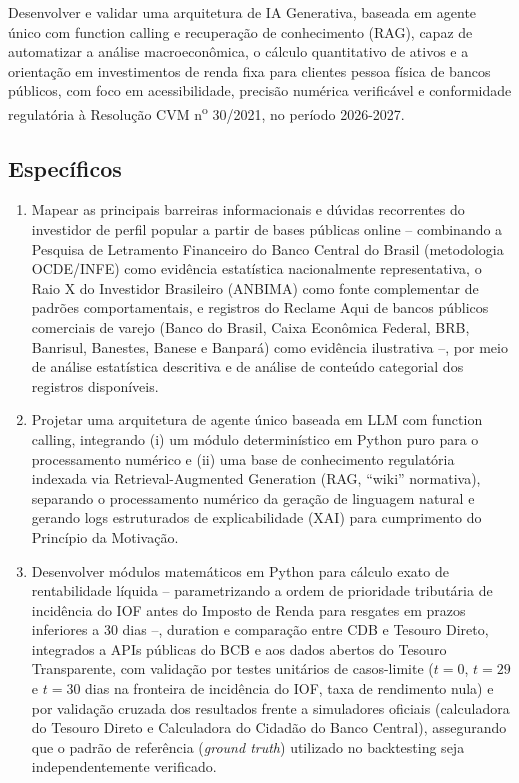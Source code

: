 Desenvolver e validar uma arquitetura de IA Generativa, baseada em agente
\'unico com function calling e recupera\c{c}\~ao de conhecimento (RAG),
capaz de automatizar a an\'alise macroecon\^omica, o c\'alculo
quantitativo de ativos e a orienta\c{c}\~ao em investimentos de renda fixa
para clientes pessoa f\'isica de bancos p\'ublicos, com foco em acessibilidade,
precis\~ao num\'erica verific\'avel e conformidade regulat\'oria \`a
Resolu\c{c}\~ao CVM n\textsuperscript{o} 30/2021, no per\'iodo 2026-2027.

\subsection{Espec\'ificos}
\label{subsec:objetivos-especificos}

\begin{enumerate}[label=(\alph*)]
  \item Mapear as principais barreiras informacionais e d\'uvidas
  recorrentes do investidor de perfil popular a partir de bases p\'ublicas
  online -- combinando a Pesquisa de Letramento Financeiro do Banco
  Central do Brasil (metodologia OCDE/INFE) como evid\^encia estat\'istica
  nacionalmente representativa, o Raio X do Investidor Brasileiro (ANBIMA)
  como fonte complementar de padr\~oes comportamentais, e registros do
  Reclame Aqui de bancos p\'ublicos comerciais de varejo (Banco do Brasil,
  Caixa Econ\^omica Federal, BRB, Banrisul, Banestes, Banese e Banpar\'a)
  como evid\^encia ilustrativa --, por meio de an\'alise estat\'istica
  descritiva e de an\'alise de conte\'udo categorial dos registros
  dispon\'iveis.

  \item Projetar uma arquitetura de agente \'unico baseada em LLM com
  function calling, integrando (i) um m\'odulo determin\'istico em Python
  puro para o processamento num\'erico e (ii) uma base de conhecimento
  regulat\'oria indexada via Retrieval-Augmented Generation (RAG, ``wiki''
  normativa), separando o processamento num\'erico da gera\c{c}\~ao de
  linguagem natural e gerando logs estruturados de explicabilidade (XAI)
  para cumprimento do Princ\'ipio da Motiva\c{c}\~ao.

  \item Desenvolver m\'odulos matem\'aticos em Python para c\'alculo exato
  de rentabilidade l\'iquida -- parametrizando a ordem de prioridade
  tribut\'aria de incid\^encia do IOF antes do Imposto de Renda para
  resgates em prazos inferiores a 30 dias --, duration e compara\c{c}\~ao
  entre CDB e Tesouro Direto, integrados a APIs p\'ublicas do BCB e
  aos dados abertos do Tesouro Transparente, com valida\c{c}\~ao por testes unit\'arios de casos-limite
  ($t=0$, $t=29$ e $t=30$ dias na fronteira de incid\^encia do IOF, taxa
  de rendimento nula) e por valida\c{c}\~ao cruzada dos resultados frente
  a simuladores oficiais (calculadora do Tesouro Direto e Calculadora do
  Cidad\~ao do Banco Central),
  assegurando que o padr\~ao de refer\^encia (\textit{ground truth})
  utilizado no backtesting seja independentemente verificado.


\end{enumerate}
